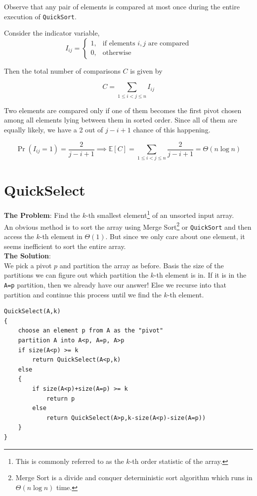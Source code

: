 \documentclass[11pt,openany]{book}
\begin{document}
\noindent Observe that any pair of elements is compared at most once 
during the entire execution of \texttt{QuickSort}.

\noindent Consider the indicator variable,
\[
I_{ij}=
\begin{cases}
1,&\text{if elements }i,j\text{ are compared}\\
0,&\text{otherwise}
\end{cases}
\]

\noindent Then the total number of comparisons $C$ is given by

\[
C=\sum_{1\le i<j\le n}I_{ij}
\]

Two elements are compared only if one of them becomes the first pivot chosen 
among all elements lying between them in sorted order. Since all of them are equally likely, 
we have a 2 out of \(j-i+1\) chance of this happening.

\[
\Pr(I_{ij}=1)=\frac{2}{j-i+1}
\implies
\mathbb{E}[C]
=
\sum_{1\le i<j\le n}\frac{2}{j-i+1}
=
\Theta(n\log n)
\]

\section{QuickSelect}

\textbf{The Problem}: Find the \(k\)-th smallest element\footnote{This is commonly 
referred to as the \(k\)-th order statistic of the array.} of an unsorted input array.\\

\noindent An obvious method is to sort the array using Merge Sort\footnote{Merge Sort is a divide and conquer deterministic sort algorithm 
which runs in $\Theta(n\log n)$ time.} or \texttt{QuickSort} and then access the \(k\)-th element in $\Theta(1)$.
But since we only care about one element, it seems inefficient to sort the entire array. \\


\noindent\textbf{The Solution}:\\

\noindent We pick a pivot \(p\) and partition the array as before.
Basis the size of the partitions we can figure out which partition the \(k\)-th element is in.
If it is in the \texttt{A=p} partition, then we already have our answer!
Else we recurse into that partition and continue this process until we find the \(k\)-th element.

\begin{center}
\begin{minipage}{0.9\linewidth}
\begin{framed}
\begin{Verbatim}
QuickSelect(A,k)
{
	choose an element p from A as the "pivot"
	partition A into A<p, A=p, A>p
	if size(A<p) >= k
		return QuickSelect(A<p,k)
	else
	{
		if size(A<p)+size(A=p) >= k
			return p
		else
			return QuickSelect(A>p,k-size(A<p)-size(A=p))
	}
}
\end{Verbatim}
\vspace{-4mm}
\end{framed}
\end{minipage}
\end{center}
\end{document}
